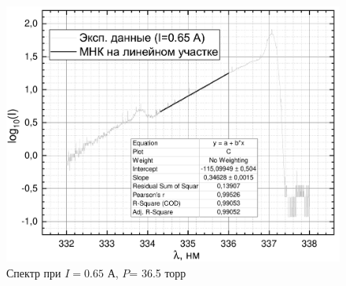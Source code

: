 \begin{figure}[H]
\begin{minipage}{0.45\linewidth}
		\includegraphics[width=\linewidth]{data/graph_I=0,65_polosa}
		\caption{Спектр при $I= 0.65 $ А, $P$= 36.5 торр}	
		\label{polosa_65}
	\end{minipage} 
	\hfill
\end{figure}